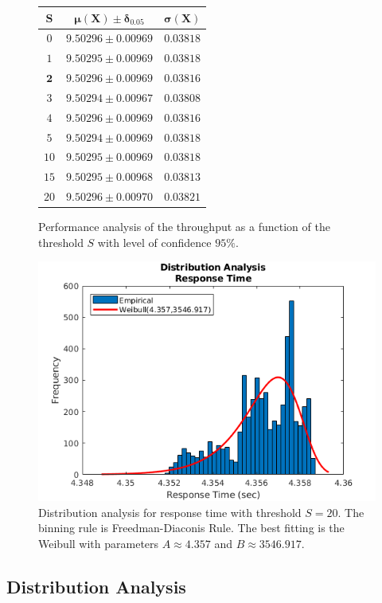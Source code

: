 \begin{figure}
	\begin{center}
		\begin{tabular}{|c||c|c|}
			\hline
			$\mathbf{S}$ & $\mathbf{\mu(X)\pm\delta_{0.05}}$ & $\mathbf{\sigma(X)}$\\
			\hline
			$0$  & $9.50296\pm 0.00969$ & $0.03818 $ \\
			$1$  & $9.50295\pm 0.00969$ & $0.03818$ \\
			$\mathbf{2}$  & $\mathbf{9.50296\pm 0.00969}$ & $\mathbf{0.03816}$ \\
			$3$  & $9.50294\pm 0.00967$ & $0.03808$ \\
			$4$  & $9.50296\pm 0.00969$ & $0.03816$ \\
			$5$  & $9.50294\pm 0.00969$ & $0.03818$ \\
			$10$ & $9.50295\pm 0.00969$ & $0.03818$ \\
			$15$ & $9.50295\pm 0.00968$ & $0.03813$ \\
			$20$ & $9.50296\pm 0.00970$ & $0.03821$ \\
			\hline
		\end{tabular}
	\end{center}
	\caption{Performance analysis of the throughput as a function of the threshold $S$ with level of confidence $95\%$.}
	\label{tbl:evaluation-performance-analysis-throughput}
\end{figure}

\begin{figure}
	\includegraphics[width=\columnwidth]{fig/evaluation-distribution-analysis-response-time}
	\caption{Distribution analysis for response time with threshold $S=20$. The binning rule is Freedman-Diaconis Rule. The best fitting is the Weibull with parameters $A\approx4.357$ and $B\approx3546.917$.}
	\label{fig:evaluation-distribution-analysis-response-time}
\end{figure}

\subsection{Distribution Analysis}
\label{sec:evaluation-distribution-analysis}
